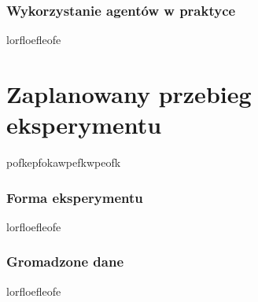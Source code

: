 \subsubsection*{Wykorzystanie agentów w praktyce}

lorfloefleofe

\section{Zaplanowany przebieg eksperymentu}\label{section:ch4_3}

pofkepfokawpefkwpeofk

\subsubsection*{Forma eksperymentu}

lorfloefleofe

\subsubsection*{Gromadzone dane}

lorfloefleofe